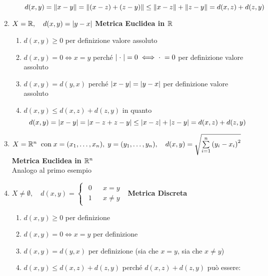 \begin{example}
\begin{enumerate}
\begin{enumerate}[label=\arabic*]
					\[d(x,y) = \left\|x-y\right\| = \left\|(x-z) + (z-y)\right\| \leq \left\|x-z\right\| + \left\|z-y\right\| = d(x,z) + d(z,y)\]
					\begin{center}
					\end{center}
			\end{enumerate}
		\item $X=\mathbb{R},\quad d(x,y)=\left|y-x\right|$ \hfill {\footnotesize\textbf{Metrica Euclidea in $\mathbb{R}$}}
			\begin{enumerate}[label=\arabic*.]
				\item $d(x,y) \geq 0$ per definizione valore assoluto
				\item $d(x,y) = 0 \iff x = y$ perché $\left|\;\cdot\;\right| = 0 \iff \cdot\; = 0$ per definizione valore assoluto
				\item $d(x,y)=d(y,x)$ perché $\left|x - y\right| = \left|y - x\right|$ per definizione valore assoluto
				\item $d(x,y) \leq d(x,z) + d(z,y)$ in quanto
					\[d(x,y) = \left|x-y\right| = \left|x-z+z-y\right| \leq \left|x-z\right| + \left|z-y\right| = d(x,z) + d(z,y)\]
			\end{enumerate}
		\item $X=\mathbb{R}^n \;\; \text{con}\; x=(x_1,\ldots,x_n),\; y=(y_1,\ldots,y_n),\quad d(x,y)=\sqrt{\sum\limits_{i=1}^{n}{\left(y_i-x_i\right)}^2}$ \hfill {\footnotesize\textbf{Metrica Euclidea in $\mathbb{R}^n$}} \label{ex:dist_eucl}\\
			Analogo al primo esempio
		\item $X\ne \emptyset,\quad d(x,y)=
			\begin{cases}
				\begin{matrix}
					0&&x=y\\
					1&&x \ne y
				\end{matrix}
			\end{cases}$ \hfill {\footnotesize\textbf{Metrica Discreta}}\label{ex:dist_discr}
			\begin{enumerate}[label=\arabic*.]
				\item $d(x,y) \geq 0$ per definizione
				\item $d(x,y) = 0 \iff x = y$ per definizione
				\item $d(x,y)=d(y,x)$ per definizione (sia che $x = y$, sia che $x \neq y$)
				\item $d(x,y) \leq d(x,z) + d(z,y)$ perché $d(x,z) + d(z,y)$ può essere:

\end{enumerate}
\end{enumerate}
\end{example}
